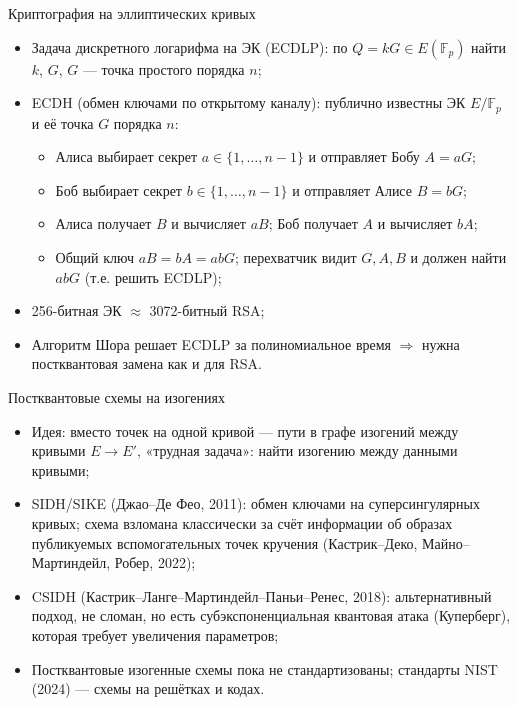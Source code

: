 \documentclass[serif, aspectratio=169]{beamer}
\begin{document}
\begin{frame}{Криптография на эллиптических кривых}
    \begin{itemize}
        \item Задача дискретного логарифма на ЭК (ECDLP): по $Q=kG\in E(\mathbb{F}_p)$ найти $k$, $G$, $G$ --- точка простого порядка $n$;
        \item ECDH (обмен ключами по открытому каналу): публично известны ЭК $E/\mathbb{F}_p$ и её точка $G$ порядка $n$:
        \begin{itemize}
            \item Алиса выбирает секрет $a\in\{1,\dots,n-1\}$ и отправляет Бобу $A=aG$;
            \item Боб выбирает секрет $b\in\{1,\dots,n-1\}$ и отправляет Алисе $B=bG$;
            \item Алиса получает $B$ и вычисляет $aB$; Боб получает $A$ и вычисляет $bA$;
            \item Общий ключ $aB=bA=abG$; перехватчик видит $G,A,B$ и должен найти $abG$ (т.е. решить ECDLP);
        \end{itemize}
        \item 256-битная ЭК $\approx$ 3072-битный RSA;
        \item Алгоритм Шора решает ECDLP за полиномиальное время $\Rightarrow$ нужна постквантовая замена как и для RSA.
    \end{itemize}
    \note{
        \begin{itemize}
            \item ---
        \end{itemize}
    }
\end{frame}

\begin{frame}{Постквантовые схемы на изогениях}
    \begin{itemize}
        \item Идея: вместо точек на одной кривой --- пути в графе изогений между кривыми $E\to E'$, «трудная задача»: найти изогению между данными кривыми;
        \item SIDH/SIKE (Джао--Де Фео, 2011): обмен ключами на суперсингулярных кривых; схема взломана классически за счёт информации об образах публикуемых вспомогательных точек кручения (Кастрик--Деко, Майно--Мартиндейл, Робер, 2022);
        \item CSIDH (Кастрик--Ланге--Мартиндейл--Паньи--Ренес, 2018): альтернативный подход, не сломан, но есть субэкспоненциальная квантовая атака (Куперберг), которая требует увеличения параметров;
        \item Постквантовые изогенные схемы пока не стандартизованы; стандарты NIST (2024) --- схемы на решётках и кодах.
    \end{itemize}
    \note{
        \begin{itemize}
            \item ---
        \end{itemize}
    }
\end{frame}
\end{document}

